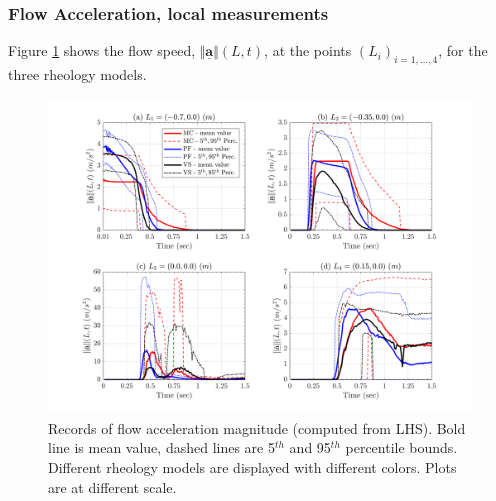 \documentclass{article}
\begin{document}
\subsubsection{Flow Acceleration, local measurements}
Figure \ref{fig:Ramp-AccL} shows the flow speed, $\Vert \underline{\mathbf{a}} \Vert(L,t)$, at the points $(L_i)_{i=1,\dots,4}$, for the three rheology models.
\begin{figure}[H]
         \centering
        \includegraphics[width=1\textwidth]{NewTest/Acceleration.png}
        \caption{Records of flow acceleration magnitude (computed from LHS). Bold line is mean value, dashed lines are 5$^{th}$ and 95$^{th}$ percentile bounds. Different rheology models are displayed with different colors. Plots are at different scale.}
        \label{fig:Ramp-AccL}
\end{figure}
\end{document}
